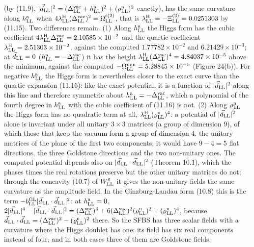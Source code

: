 \documentclass[
  10pt,
]{article}
\begin{document}
(by (11.9),
\(\lvert\vec d_{\rm LL}\rvert^2=(\Delta^{\rm vac}_{\rm LL}+h^{\rm a}_{\rm LL})^2+(\varrho^{\rm n}_{\rm LL})^2\)
exactly), has the same curvature along \(h^{\rm a}_{\rm LL}\) when
\(4\lambda^{\rm H}_{\rm LL}(\Delta^{\rm vac}_{\rm LL})^2=\Omega^{\rm s(2)}_{\rm LL}\),
that is \(\lambda^{\rm H}_{\rm LL}=-\Xi^{(2)}_{\rm LL}=0.0251303\) by
(11.15). Two differences remain. (1) Along \(h^{\rm a}_{\rm LL}\) the
Higgs form has the cubic coefficient
\(4\lambda^{\rm H}_{\rm LL}\Delta^{\rm vac}_{\rm LL}=2.10585\times10^{-2}\)
and the quartic coefficient
\(\lambda^{\rm H}_{\rm LL}=2.51303\times10^{-2}\), against the computed
\(1.77782\times10^{-2}\) and \(6.21429\times10^{-3}\); at
\(\vec d_{\rm LL}=0\)
(\(h^{\rm a}_{\rm LL}=-\Delta^{\rm vac}_{\rm LL}\)) it has the height
\(\lambda^{\rm H}_{\rm LL}(\Delta^{\rm vac}_{\rm LL})^4=4.84037\times10^{-5}\)
above the minimum, against the computed
\(-\Omega^{\rm min}_{\rm LL}=5.28845\times10^{-5}\) (Figure 24(b)). For
negative \(h^{\rm a}_{\rm LL}\) the Higgs form is nevertheless closer to
the exact curve than the quartic expansion (11.16): like the exact
potential, it is a function of \(\lvert\vec d_{\rm LL}\rvert^2\) along
this line and therefore symmetric about
\(h^{\rm a}_{\rm LL}=-\Delta^{\rm vac}_{\rm LL}\), which a polynomial of
the fourth degree in \(h^{\rm a}_{\rm LL}\) with the cubic coefficient
of (11.16) is not. (2) Along \(\varrho^{\rm n}_{\rm LL}\) the Higgs form
has no quadratic term at all,
\(\lambda^{\rm H}_{\rm LL}(\varrho^{\rm n}_{\rm LL})^4\): a potential of
\(\lvert\vec d_{\rm LL}\rvert^2\) alone is invariant under all unitary
\(3\times3\) matrices (a group of dimension 9), of which those that keep
the vacuum form a group of dimension 4, the unitary matrices of the
plane of the first two components; it would have \(9-4=5\) flat
directions, the three Goldstone directions and the two non-unitary ones.
The computed potential depends also on
\(\lvert\vec d_{\rm LL}\cdot\vec d_{\rm LL}\rvert^2\) (Theorem 10.1),
which the phases times the real rotations preserve but the other unitary
matrices do not; through the concavity (10.7) of \(W^{\rm g}_{\rm LL}\)
it gives the non-unitary fields the same curvature as the amplitude
field. In the Ginzburg-Landau form (10.8) this is the term
\(-b^{\rm GL}_{\rm LL}\lvert\vec d_{\rm LL}\cdot\vec d_{\rm LL}\rvert^2\):
at \(h^{\rm a}_{\rm LL}=0\),
\(2\lvert\vec d_{\rm LL}\rvert^4-\lvert\vec d_{\rm LL}\cdot\vec d_{\rm LL}\rvert^2=(\Delta^{\rm vac}_{\rm LL})^4+6(\Delta^{\rm vac}_{\rm LL})^2(\varrho^{\rm n}_{\rm LL})^2+(\varrho^{\rm n}_{\rm LL})^4\),
because
\(\vec d_{\rm LL}\cdot\vec d_{\rm LL}=(\Delta^{\rm vac}_{\rm LL})^2-(\varrho^{\rm n}_{\rm LL})^2\)
there. So the SFBS has three scalar fields with a curvature where the
Higgs doublet has one: its field has six real components instead of
four, and in both cases three of them are Goldstone fields.
\end{document}
